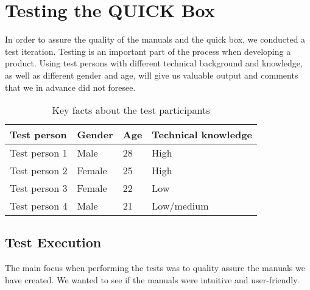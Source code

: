 \chapter{Testing the QUICK Box}
\label{chp:test} 

In order to assure the quality of the manuals and the \gls{quick} box, we conducted a test iteration. Testing is an important part of the process when developing a product. Using test persons with different technical background and knowledge, as well as different gender and age, will give us valuable output and comments that we in advance did not foresee. 

\begin{center}
\begin{table}[h!]
\caption{\label{tab:testpersons}Key facts about the test participants}
    \begin{tabular}{ | l | l | l | l |}
    \hline
    \textbf{Test person} & \textbf{Gender} & \textbf{Age} & \textbf{Technical knowledge} \\ 
    \hline
    Test person 1 &  Male & 28 & High\\ 
    \hline
    Test person 2 &  Female & 25 & High\\  
    \hline
    Test person 3 &  Female & 22 & Low\\  
    \hline
    Test person 4 &  Male & 21 & Low/medium\\  
    \hline
    \end{tabular}
   \end{table}
\end{center}


\section{Test Execution}
The main focus when performing the tests was to quality assure the manuals we have created. We wanted to see if the manuals were intuitive and user-friendly.

